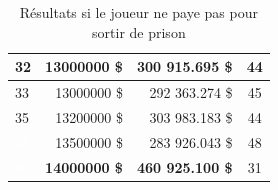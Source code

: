 \documentclass[letterpaper]{article}
\begin{document}
\begin{table}[h]
\begin{tabular}{|l|r|r|c|}
	  \cellcolor[HTML]{2E8B57} 32 & 13000000 \$ & 300 915.695 \$ & 44 \\ \hline
	  \cellcolor[HTML]{2E8B57} 33 & 13000000 \$ & 292 363.274 \$ & 45 \\ \hline
	  \cellcolor[HTML]{2E8B57} 35 & 13200000 \$ & 303 983.183 \$ & 44 \\ \hline
	  \cellcolor[HTML]{483D8B} \textcolor{white}{38} & 13500000 \$ & 283 926.043 \$ & 48 \\ \hline
	  \cellcolor[HTML]{483D8B} \textcolor{white}{40} & \textbf{14000000 \$} & \textbf{460 925.100 \$} & 31 \\ \hline
	\end{tabular}
	\caption{Résultats si le joueur ne paye pas pour sortir de prison}
	\label{table:result_tour_paye_pas}
      \end{table}
    
\end{document}
